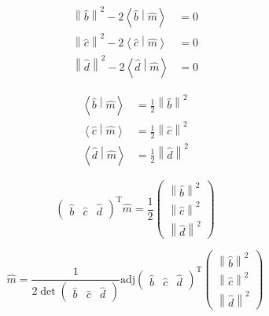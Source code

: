 \documentclass[10pt, twoside, fleqn]{article}
\newcommand{\norm}[1]{\left\| #1 \right\|}
\newcommand{\scalarproduct}[2]{\left\langle #1 \middle| #2 \right\rangle}
\begin{document}
        \begin{align*}
          \norm{\hat{b}}^2 - 2 \scalarproduct{\hat{b}}{\hat{m}} &= 0 \\
          \norm{\hat{c}}^2 - 2 \scalarproduct{\hat{c}}{\hat{m}} &= 0 \\
          \norm{\hat{d}}^2 - 2 \scalarproduct{\hat{d}}{\hat{m}} &= 0
        \end{align*}

        \begin{align*}
          \scalarproduct{\hat{b}}{\hat{m}} &= \frac{1}{2}\norm{\hat{b}}^2 \\
          \scalarproduct{\hat{c}}{\hat{m}} &= \frac{1}{2}\norm{\hat{c}}^2 \\
          \scalarproduct{\hat{d}}{\hat{m}} &= \frac{1}{2}\norm{\hat{d}}^2
        \end{align*}

        \[
          \begin{pmatrix}
            \hat{b} & \hat{c} & \hat{d}
          \end{pmatrix}
          ^\mathrm{T}
          \hat{m}
          = \frac{1}{2}
          \begin{pmatrix}
            \norm{\hat{b}}^2 \\
            \norm{\hat{c}}^2 \\
            \norm{\hat{d}}^2
          \end{pmatrix}
        \]

        \[
          \hat{m} =
          \frac{1}{2\det\begin{pmatrix}\hat{b} & \hat{c} & \hat{d}\end{pmatrix}}
          \mathrm{adj} \begin{pmatrix}\hat{b} & \hat{c} & \hat{d}\end{pmatrix}^\mathrm{T}
          \begin{pmatrix}
            \norm{\hat{b}}^2 \\
            \norm{\hat{c}}^2 \\
            \norm{\hat{d}}^2
          \end{pmatrix}
        \]
\end{document}
